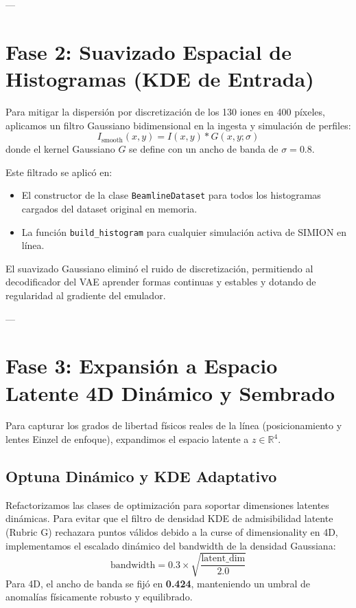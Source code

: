 \documentclass[11pt,spanish]{article}
\begin{document}
---

\section{Fase 2: Suavizado Espacial de Histogramas (KDE de Entrada)}
Para mitigar la dispersión por discretización de los 130 iones en 400 píxeles, aplicamos un filtro Gaussiano bidimensional en la ingesta y simulación de perfiles:
\begin{equation}
I_{\text{smooth}}(x, y) = I(x, y) * G(x, y; \sigma)
\end{equation}
donde el kernel Gaussiano $G$ se define con un ancho de banda de $\sigma = 0.8$.

Este filtrado se aplicó en:
\begin{itemize}
    \item El constructor de la clase \texttt{BeamlineDataset} para todos los histogramas cargados del dataset original en memoria.
    \item La función \texttt{build\_histogram} para cualquier simulación activa de SIMION en línea.
\end{itemize}
El suavizado Gaussiano eliminó el ruido de discretización, permitiendo al decodificador del VAE aprender formas continuas y estables y dotando de regularidad al gradiente del emulador.

---

\section{Fase 3: Expansión a Espacio Latente 4D Dinámico y Sembrado}
Para capturar los grados de libertad físicos reales de la línea (posicionamiento y lentes Einzel de enfoque), expandimos el espacio latente a $z \in \mathbb{R}^4$.

\subsection{Optuna Dinámico y KDE Adaptativo}
Refactorizamos las clases de optimización para soportar dimensiones latentes dinámicas. Para evitar que el filtro de densidad KDE de admisibilidad latente (Rubric G) rechazara puntos válidos debido a la curse of dimensionality en 4D, implementamos el escalado dinámico del bandwidth de la densidad Gaussiana:
\begin{equation}
\text{bandwidth} = 0.3 \times \sqrt{\frac{\text{latent\_dim}}{2.0}}
\end{equation}
Para 4D, el ancho de banda se fijó en \textbf{0.424}, manteniendo un umbral de anomalías físicamente robusto y equilibrado.
\end{document}
